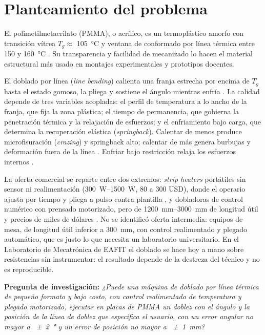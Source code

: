 \section{Planteamiento del problema}

El polimetilmetacrilato (PMMA), o acrílico, es un termoplástico amorfo con transición vítrea $T_g \approx$ \SI{105}{\celsius} \cite{gilormini2010,brandrup1999} y ventana de conformado por línea térmica entre \num{150} y \SI{160}{\celsius} \cite{plexiglas_forming,throne2008}. Su transparencia y facilidad de mecanizado lo hacen el material estructural más usado en montajes experimentales y prototipos docentes.

El doblado por línea (\emph{line bending}) calienta una franja estrecha por encima de $T_g$ hasta el estado gomoso, la pliega y sostiene el ángulo mientras enfría \cite{osswald2012,throne2008}. La calidad depende de tres variables acopladas: el perfil de temperatura a lo ancho de la franja, que fija la zona plástica; el tiempo de permanencia, que gobierna la penetración térmica y la relajación de esfuerzos; y el enfriamiento bajo carga, que determina la recuperación elástica (\emph{springback}). Calentar de menos produce microfisuración (\emph{crazing}) y springback alto; calentar de más genera burbujas y deformación fuera de la línea \cite{yan2023,plexiglas_forming}. Enfriar bajo restricción relaja los esfuerzos internos \cite{osswald2012,yan2023}.

La oferta comercial se reparte entre dos extremos: \emph{strip heaters} portátiles sin sensor ni realimentación (\SIrange{300}{1500}{\watt}, 80 a 300 USD), donde el operario ajusta por tiempo y pliega a pulso contra plantilla \cite{shannon_line}, y dobladoras de control numérico con prensado motorizado, pero de \SIrange{1200}{3000}{\milli\meter} de longitud útil y precios de miles de dólares \cite{shannon_bending,mic_auto}. No se identificó oferta intermedia: equipos de mesa, de longitud útil inferior a \SI{300}{\milli\meter}, con control realimentado y plegado automático, que es justo lo que necesita un laboratorio universitario. En el Laboratorio de Mecatrónica de EAFIT el doblado se hace hoy a mano sobre resistencias sin instrumentar: el resultado depende de la destreza del técnico y no es reproducible.

\noindent\textbf{Pregunta de investigación:} \emph{¿Puede una máquina de doblado por línea térmica de pequeño formato y bajo costo, con control realimentado de temperatura y plegado motorizado, ejecutar en placas de PMMA un doblez con el ángulo y la posición de la línea de doblez que especifica el usuario, con un error angular no mayor a \SI{\pm 2}{\degree} y un error de posición no mayor a \SI{\pm 1}{\milli\meter}?}
